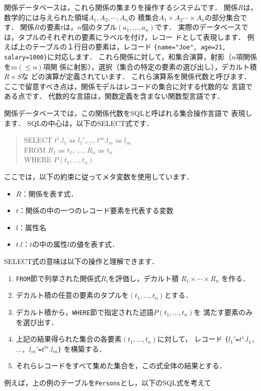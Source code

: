 \documentclass{jbook}
\newenvironment{program}{\begin{tt}\begin{quote}}{\end{quote}\end{tt}}
\begin{document}
	関係データベースは，これら関係の集まりを操作するシステムです．
	関係$R$は，数学的には与えられた領域$A_1,A_2,\cdots,A_n$の
積集合$A_1\times A_2 \cdots \times A_n$の部分集合です．
	関係$R$の要素$t$は，$n$個のタプル$(a_1,\ldots,a_n)$です．
	実際のデータベースでは，タプルのそれぞれの要素にラベルを付け，レコー
ドとして表現します．
	例えば上のテーブルの１行目の要素は，レコード
{\tt \{name="Joe", age=21, salary=1000\}}に対応します．
	これら関係に対して，和集合演算，射影（$n$項関係を$m (\le n)$項関
係に射影），選択（集合の特定の要素の選び出し），デカルト積 $R\times S$な
どの演算が定義されています．
	これら演算系を関係代数と呼びます．
	ここで留意すべき点は，関係モデルはレコードの集合に対する代数的な
言語である点です．
	代数的な言語は，関数定義を含まない関数型言語です．

	関係データベースでは，この関係代数をSQLと呼ばれる集合操作言語で
表現します．
	SQLの中心は，以下のSELECT式です．
\begin{program}
SELECT $t^1.l_1$ as $l_1'$,$\ldots$, $t^m.l_m$ as $l_m$\\
FROM $R_1$ as $t_1$, $\ldots$, $R_n$ as $t_n$\\
WHERE $P(t_1,\ldots, t_n)$
\end{program}
	ここでは，以下の約束に従ってメタ変数を使用しています．
\begin{itemize}
\item $R$：関係を表す式．
\item $t$：関係の中の一つのレコード要素を代表する変数
\item $l$：属性名
\item $t.l$：$t$の中の属性$l$の値を表す式．
\end{itemize}
	SELECT式の意味は以下の操作と理解できます．
\begin{enumerate}
\item {\tt FROM}節で列挙された関係式$R_i$を評価し，デカルト積
$
R_1 \times \cdots \times R_n
$
を作る．
\item デカルト積の任意の要素のタプルを$(t_1,\ldots,t_n)$とする．
\item デカルト積から，{\tt WHERE}節で指定された述語$P(t_1,\ldots,t_n)$を
満たす要素のみを選び出す．
\item
	上記の結果得られた集合の各要素$(t_1,\ldots,t_n)$に対して，
レコード
{\tt \{$l_1'$=$t^1.l_1$, $\ldots$, $l_m'$=$t^m.l_m$\}}
を構築する．
\item それらレコードをすべて集めた集合を，この式全体の結果とする．
\end{enumerate}
	例えば，上の例のテーブルを{\tt Persons}とし，以下のSQL式を考えて
\end{document}
